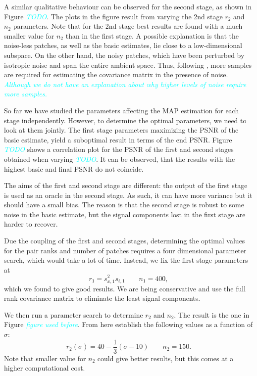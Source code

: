 \documentclass[10pt, journal, twocolumn, final, a4paper]{IEEEtran}
\newcommand{\pa}[1]{\textcolor{cyan}{#1}}
\newcommand{\pcomment}[1]{\textit{\pa{#1}}}
\begin{document}
A similar qualitative behaviour can be observed for the second stage, as shown in Figure \pcomment{TODO}. 
The plots in the figure result from varying the 2nd stage $r_2$ and
$n_{2}$ parameters.
%
Note that for the 2nd stage best results are found with a much smaller value
for $n_{2}$ than in the first stage.
%
A possible explanation is that the noise-less patches, as well as the basic
estimates, lie close to a low-dimensional subspace. On the other hand, the
noisy patches, which have been perturbed by isotropic noise and span the entire
ambient space. Thus, following \cite{Vershynin2012}, more samples are required for
estimating the covariance matrix in the presence of noise.
\pcomment{Although we do not have an explanation about why higher levels of noise
require more samples.}

So far we have studied the parameters affecting the MAP estimation for each stage 
independently. However, to determine the optimal parameters, we need to look at
them jointly. The first stage parameters maximizing the PSNR of the basic
estimate, yield a suboptimal result in terms of the end PSNR.
%
Figure \pcomment{TODO} shows a correlation plot for the PSNR of the first and
second stages obtained when varying \pcomment{TODO}. It can be observed, that the 
results with the highest basic and final PSNR do not coincide.

The aims of the first and second stage are different: the output 
of the first stage is used as an oracle in the second stage. As such, it can
have more variance but it should have a small bias. The reason is that the
second stage is robust to some noise in the basic estimate, but
the signal components lost in the first stage are harder to recover.

Due the coupling of the first and second stages, determining the optimal values
for the pair ranks and number of patches requires a four dimensional parameter
search, which would take a lot of time.
%
Instead, we fix the first stage parameters at
\[r_1 = s_{x,1}^2s_{t,1}\quad\quad n_{1} = 400,\]
which we found to give good results. We are being conservative and use the
full rank covariance matrix to eliminate the least signal components.

We then run a parameter search to determine $r_2$ and $n_{2}$.
The result is the one in Figure \pcomment{figure used before}. From here
establish the following values as a function of $\sigma$:
\[r_2(\sigma) = 40 - \frac13(\sigma - 10)\quad\quad n_{2} = 150.\]
Note that smaller value for $n_{2}$ could give better results,
but this comes at a higher computational cost.
\end{document}
